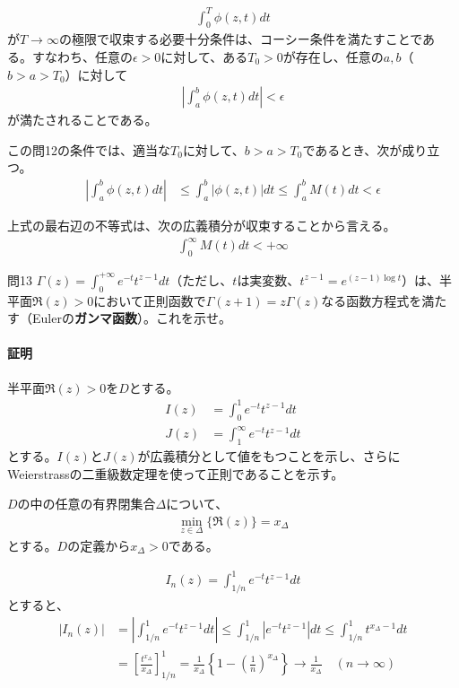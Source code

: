 \begin{align*}
    \int_{0}^{T}\phi(z,t)dt
\end{align*}
が$T\longrightarrow\infty$の極限で収束する必要十分条件は、コーシー条件を満たすことである。すなわち、任意の$\epsilon>0$に対して、ある$T_0>0$が存在し、任意の$a,b$（$b>a>T_0$）に対して
\begin{align*}
    \left|\int_{a}^{b}\phi(z,t)dt\right|<\epsilon
\end{align*}
が満たされることである。

この問12の条件では、適当な$T_0$に対して、$b>a>T_0$であるとき、次が成り立つ。
\begin{align*}
    \left|\int_{a}^{b}\phi(z,t)dt\right|
    &\le\int_{a}^{b}|\phi(z,t)|dt
    \le\int_{a}^{b}M(t)dt
    <\epsilon
\end{align*}

上式の最右辺の不等式は、次の広義積分が収束することから言える。
\begin{align*}
    \int_{0}^{\infty}M(t)dt<+\infty
\end{align*}



\begin{mysimplebox}{問13}
    $\Gamma(z)=\int_{0}^{+\infty}e^{-t}t^{z-1}dt$（ただし、$t$は実変数、$t^{z-1}=e^{(z-1)\log t}$）は、半平面$\Re(z)>0$において正則函数で$\Gamma(z+1)=z\Gamma(z)$なる函数方程式を満たす（Eulerの\textbf{ガンマ函数}）。これを示せ。
\end{mysimplebox}
\paragraph{証明}
半平面$\Re(z)>0$を$D$とする。
\begin{align*}
    I(z)&=\int_{0}^{1}e^{-t}t^{z-1}dt\\
    J(z)&=\int_{1}^{\infty}e^{-t}t^{z-1}dt
\end{align*}
とする。$I(z)$と$J(z)$が広義積分として値をもつことを示し、さらにWeierstrassの二重級数定理を使って正則であることを示す。

$D$の中の任意の有界閉集合$\Delta$について、
\begin{align*}
    \min_{z\in\Delta}\{\Re(z)\}=x_\Delta
\end{align*}
とする。$D$の定義から$x_\Delta>0$である。

\begin{align*}
    I_n(z)=\int_{1/n}^{1}e^{-t}t^{z-1}dt
\end{align*}
とすると、
\begin{align*}
    |I_n(z)|&=\left|\int_{1/n}^{1}e^{-t}t^{z-1}dt\right|
    \le\int_{1/n}^{1}|e^{-t}t^{z-1}|dt
    \le\int_{1/n}^{1}t^{x_\Delta-1}dt\\
    &=\left[\frac{t^{x_\Delta}}{x_\Delta}\right]_{1/n}^1
    =\frac{1}{x_\Delta}\left\{1-\left(\frac{1}{n}\right)^{x_\Delta}\right\}
    \longrightarrow\frac{1}{x_\Delta}\quad(n\longrightarrow\infty)
\end{align*}

